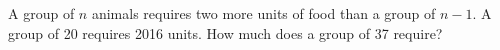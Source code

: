A group of $n$ animals requires two more units of food than a group of $n-1$. A group of 20 requires 2016 units. How much does a group of 37 require?

